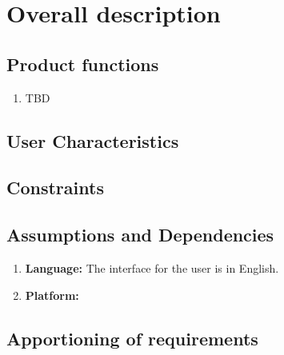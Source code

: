 \documentclass[12pt]{article}
\begin{document}
\section{Overall description}
\subsection{Product functions}


\begin{enumerate}
\item TBD
\end{enumerate}

\subsection{User Characteristics}


\subsection{Constraints}

\subsection{Assumptions and Dependencies}
\begin{enumerate}
\item \textbf{Language:} The interface for the user is in English.
\item \textbf{Platform:} 
\end{enumerate}

\subsection{Apportioning of requirements}

\end{document}
